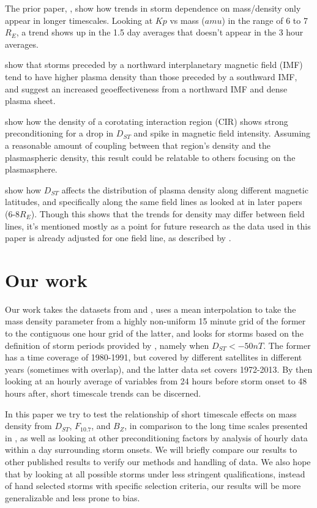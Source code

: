\documentclass[10pt,twocolumn]{article}
\begin{document}
The prior paper, \cite{Takahashi2006}, show how trends in storm dependence on mass/density only appear in longer timescales. Looking at $Kp$ vs mass ($amu$) in the range of 6 to 7 $R_E$, a trend shows up in the 1.5 day averages that doesn't appear in the 3 hour averages.

\cite{Lavraud2006} show that storms preceded by a northward interplanetary magnetic field (IMF) tend to have higher plasma density than those preceded by a southward IMF, and suggest an increased geoeffectiveness from a northward IMF and dense plasma sheet.

\cite{Tsurutani1997} show how the density of a corotating interaction region (CIR) shows strong preconditioning for a drop in $D_{ST}$ and spike in magnetic field intensity. Assuming a reasonable amount of coupling between that region's density and the plasmaspheric density, this result could be relatable to others focusing on the plasmasphere. 

\cite{Denton2006} show how $D_{ST}$ affects the distribution of plasma density along different magnetic latitudes, and specifically along the same field lines as looked at in later papers (6-8$R_E$). Though this shows that the trends for density may differ between field lines, it's mentioned mostly as a point for future research as the data used in this paper is already adjusted for one field line, as described by \cite{Takahashi2010}.



\section{Our work}
Our work takes the datasets from \cite{Denton} and \cite{Reconstruction}, uses a mean interpolation to take the mass density parameter from a highly non-uniform 15 minute grid of the former to the contiguous one hour grid of the latter, and looks for storms based on the definition of storm periods provided by \cite{Takahashi2010}, namely when $D_{ST}<-50nT$. The former has a time coverage of 1980-1991, but covered by different satellites in different years (sometimes with overlap), and the latter data set covers 1972-2013. By then looking at an hourly average of variables from 24 hours before storm onset to 48 hours after, short timescale trends can be discerned. 

In this paper we try to test the relationship of short timescale effects on mass density from $D_{ST}$, $F_{10.7}$, and $B_Z$, in comparison to the long time scales presented in \cite{Takahashi2010,Takahashi2006}, as well as looking at other preconditioning factors by analysis of hourly data within a day surrounding storm onsets. We will briefly compare our results to other published results to verify our methods and handling of data. We also hope that by looking at all possible storms under less stringent qualifications, instead of hand selected storms with specific selection criteria, our results will be more generalizable and less prone to bias.
\end{document}
